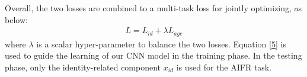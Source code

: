 \documentclass[runningheads]{llncs}
\begin{document}



Overall, the two losses are combined to a multi-task loss for jointly optimizing, as below:
\begin{equation}\label{5}
\begin{array}{c}
L = {L_{id}} + \lambda {L_{age}}
\end{array}
\end{equation}
where $\lambda$ is a scalar hyper-parameter to balance the two losses.
Equation \ref{5} is used to guide the learning of our CNN model in the training phase. 
In the testing phase, only the identity-related component $x_{id}$ is used for the AIFR task.
\end{document}

